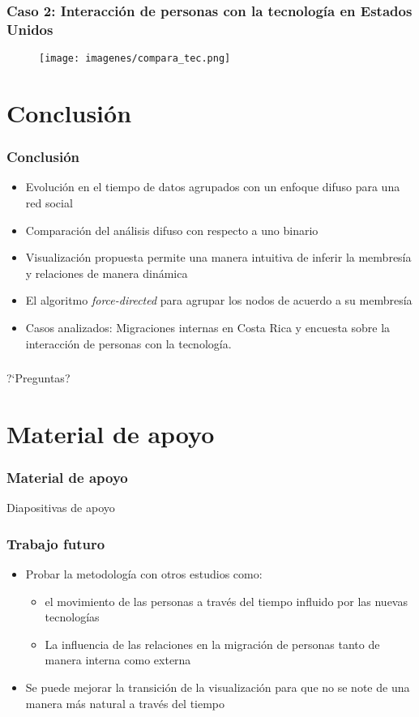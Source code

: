 \documentclass[hyperref={pdfpagelabels=false}]{beamer}
\makeatletter
\def\makethanks{%
  \begin{frame}
  \frametitle{\@thankstitle}
  ?`Preguntas?
  \end{frame}
}
\makeatother
\begin{document}
\begin{frame}
\frametitle{Caso 2: Interacci\'on de personas con la tecnolog\'ia en Estados Unidos}
\begin{figure}
        \begin{center}
            \texttt{[image: imagenes/compara\_tec.png]}
        \end{center}
    \end{figure}   
\end{frame}



\section{Conclusi\'on}
\begin{frame}
\frametitle{Conclusi\'on}
\begin{itemize}
\item  Evoluci\'on en el tiempo de datos agrupados con un enfoque difuso para una red social
\item Comparaci\'on del an\'alisis difuso con respecto a uno binario
\item Visualizaci\'on propuesta permite una manera intuitiva de inferir la membres\'ia y relaciones de manera din\'amica
\item  El algoritmo \textit{force-directed} para agrupar los nodos de acuerdo a su membres\'ia
\item Casos analizados: Migraciones internas en Costa Rica y encuesta sobre la interacci\'on de personas con la tecnolog\'ia. 
\end{itemize} 
\end{frame}



\makethanks

\section{Material de apoyo} 
\begin{frame}
\frametitle{Material de apoyo}
Diapositivas de apoyo
\end{frame}

\begin{frame}
\frametitle{Trabajo futuro}
\begin{itemize}
\item Probar la metodolog\'ia con otros estudios como: 
\begin{itemize}
\item  el movimiento de las personas a trav\'es del tiempo influido por las nuevas tecnolog\'ias
\item La influencia de las relaciones en la migraci\'on de personas tanto de manera interna como externa
\end{itemize}
\item Se puede mejorar la transici\'on de la visualizaci\'on para que no se note de una manera m\'as natural a trav\'es del tiempo
\end{itemize} 
\end{frame}
\end{document}
